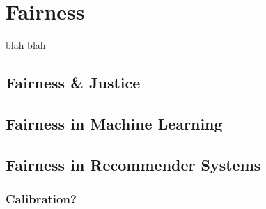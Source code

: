 \chapter{Fairness}
\label{fairness concepts}

blah blah

\section{Fairness \& Justice}
\section{Fairness in Machine Learning}

\section{Fairness in Recommender Systems}
\subsection{Calibration?}


